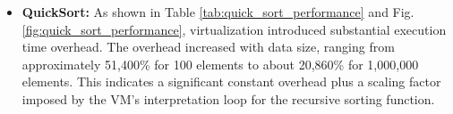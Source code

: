 \begin{itemize}
    \item \textbf{QuickSort:} As shown in Table \ref{tab:quick_sort_performance} and Fig. \ref{fig:quick_sort_performance}, virtualization introduced substantial execution time overhead. The overhead increased with data size, ranging from approximately 51,400\% for 100 elements to about 20,860\% for 1,000,000 elements. This indicates a significant constant overhead plus a scaling factor imposed by the VM's interpretation loop for the recursive sorting function.
    \begin{table}[!t] %
        \centering
        \caption{Quick Sort Execution Time Results (ms)}
        \label{tab:quick_sort_performance}
    \end{table}


\end{itemize}
